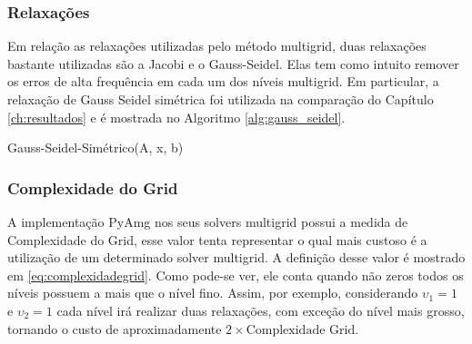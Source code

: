 \subsubsection{Relaxações}


Em relação as relaxações utilizadas pelo método multigrid, duas relaxações bastante utilizadas são a Jacobi e o Gauss-Seidel. Elas tem como intuito remover os erros de alta frequência em cada um dos níveis multigrid. Em particular, a relaxação de Gauss Seidel simétrica foi utilizada na comparação do Capítulo \ref{ch:resultados} e é mostrada no Algoritmo \ref{alg:gauss_seidel}.

\vspace{1cm}

\begin{algorithm}[H]
\caption{Gauss-Seidel-Simétrico(A, x, b)}
\label{alg:gauss_seidel}
\end{algorithm}

\vspace{1cm}


\subsubsection{Complexidade do Grid}
 
A implementação PyAmg nos seus solvers multigrid possui a medida de Complexidade do Grid, esse valor tenta representar o qual mais custoso é a utilização de um determinado solver multigrid. A definição desse valor é mostrado em \eqref{eq:complexidadegrid}. Como pode-se ver, ele conta quando não zeros todos os níveis possuem a mais que o nível fino. Assim, por exemplo, considerando $\upsilon_1=1$ e $\upsilon_2=1$ cada nível irá realizar duas relaxações, com exceção do nível mais grosso, tornando o  custo de aproximadamente $2\times\text{Complexidade Grid}$. 

